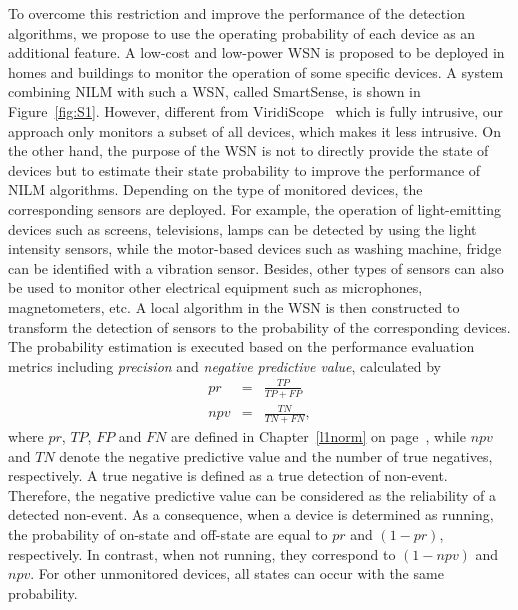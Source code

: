 To overcome this restriction and improve the performance of the detection algorithms, we propose to use the operating probability of each device as an additional feature. A low-cost and low-power WSN is proposed to be deployed in homes and buildings to monitor the operation of some specific devices. A system combining NILM with such a WSN, called SmartSense, is shown in Figure~\ref{fig:S1}. However, different from ViridiScope~\cite{Kim09Ubicomp} which is fully intrusive, our approach only monitors a subset of all devices, which makes it less intrusive. On the other hand, the purpose of the WSN is not to directly provide the state of devices but to estimate their state probability to improve the performance of NILM algorithms. Depending on the type of monitored devices, the corresponding sensors are deployed.
For example, the operation of light-emitting devices such as screens, televisions, lamps can be detected by using the light intensity sensors, while the motor-based devices such as washing machine, fridge can be identified with a vibration sensor. Besides, other types of sensors can also be used to monitor other electrical equipment such as microphones, magnetometers, etc. A local algorithm in the WSN is then constructed to transform the detection of sensors to the probability of the corresponding devices. The probability estimation is executed based on the performance evaluation metrics including \textit{precision} and \textit{negative predictive value}, calculated by
\begin{eqnarray}
pr &=& \frac{TP}{TP+FP}\\
npv &= &\frac{TN}{TN+FN},
\end{eqnarray}
where $pr$, $TP$, $FP$ and $FN$ are defined in Chapter~\ref{l1norm} on page~\pageref{eva-metrics}, while $npv$ and $TN$ denote the negative predictive value and the number of true negatives, respectively. A true negative is defined as a true detection of non-event. Therefore, the negative predictive value can be considered as the reliability of a detected non-event.
As a consequence, when a device is determined as running, the probability of on-state and off-state are equal to $pr$ and $(1-pr)$, respectively. In contrast, when not running, they correspond to $(1-npv)$ and $npv$. For other unmonitored devices, all states can occur with the same probability.
